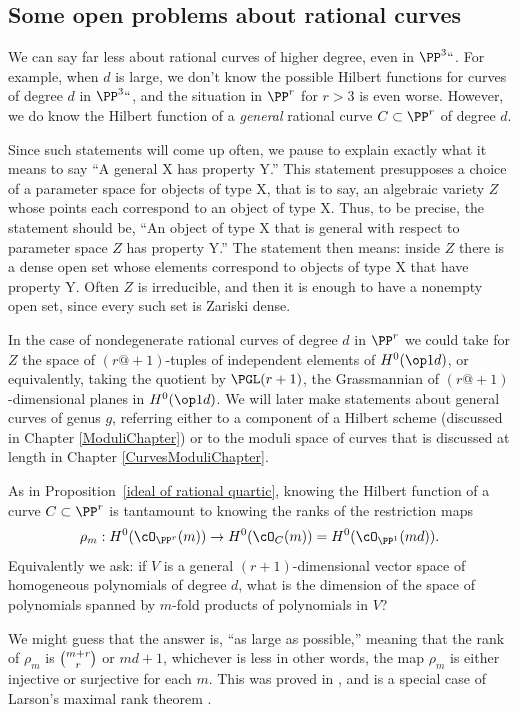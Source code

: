 \subsection*{Some open problems about rational curves}

We can say far less about rational curves of higher degree, even in $\PP^3` `$. For example, when $d$ is large, we
don't know the possible Hilbert functions for curves of degree $d$ in $\PP^3` `$, and the situation in $\PP^r$ for
$r>3$ is even worse. However, we do know the Hilbert function of a \emph{general} rational curve $C \subset \PP^r$ of degree $d$.

Since such statements will come up often, we pause to explain
exactly what it means to say
%
``A general X has property Y.'' This
statement presupposes a choice of a parameter space for objects of
type X,
that is to say, an algebraic variety $Z$ whose points each correspond to an object of type X. Thus, to be precise, the statement should be,
``An  object of type X that is general with respect to parameter space $Z$ has property Y.'' The statement then means: inside $Z$ there is
a dense open set whose elements correspond to objects of type X that have property Y. Often $Z$ is irreducible, and
then it is enough to have a nonempty open set, since every such set is Zariski dense.

In the case of nondegenerate rational curves
of degree $d$ in $\PP^{r}$
we could take for $Z$ the space of
$(r@{+}1)$-tuples of independent elements of $H^{0}(\op1d)$, or
equivalently, taking the quotient by $\PGL(r+1)$,
the
Grassmannian
%
 of $(r@{+}1)$-dimensional planes in $H^{0}(\op1d)$.
We will later make statements about general curves of genus $g$, referring either to
a component of a Hilbert scheme
(discussed in Chapter \ref{ModuliChapter}) or to the
moduli space of curves that is discussed at length in Chapter
\ref{CurvesModuliChapter}.

As in Proposition~\ref{ideal of rational quartic}, knowing the Hilbert function of a curve $C\subset \PP^{r}$ is tantamount to knowing the ranks of the restriction maps
$$
\rho_m : H^0(\cO_{\PP^r}(m)) \to H^0(\cO_C(m)) = H^0(\cO_{\PP^1}(md)).
$$
Equivalently we ask: if $V$ is a general  $(r+1)$-dimensional vector space of homogeneous polynomials of degree $d$, what is the dimension of the space of polynomials spanned by $m$-fold products of polynomials in $V$?

We might guess that the answer is, ``as large as possible,'' meaning
that the rank of $\rho_m$ is $\tbinom{m+r}{r}$ or $md+1$,
whichever is less
\emdash in
other words, the map $\rho_m$ is either injective or surjective for
each $m$. This was proved in \cite{Ballico-Ellia83}, and is a special
case of Larson's maximal rank theorem \cite{Larson}.

